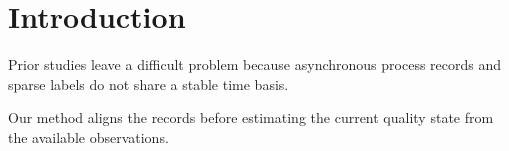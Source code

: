 \section{Introduction}
Prior studies leave a difficult problem because asynchronous process records and sparse labels do not share a stable time basis.

Our method aligns the records before estimating the current quality state from the available observations.
